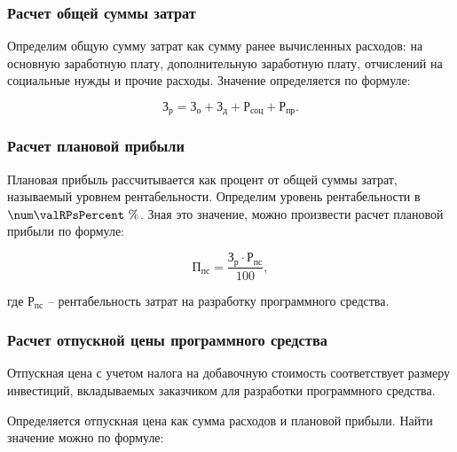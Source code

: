 \subsubsection{Расчет общей суммы затрат}

Определим общую сумму затрат как сумму ранее вычисленных расходов: на основную
заработную плату, дополнительную заработную плату, отчислений на социальные нужды и
прочие расходы. Значение определяется по формуле:

\begin{equation}
  \label{eq:econ:Zr}
  \text{З}_\text{р} = \text{З}_\text{о} + \text{З}_\text{д}
    + \text{Р}_\text{соц} + \text{Р}_\text{пр}.
\end{equation}


\subsubsection{Расчет плановой прибыли}


Плановая прибыль рассчитывается как процент от общей суммы затрат, называемый
уровнем рентабельности. Определим уровень рентабельности
в $ \num\valRPsPercent \ \% $. Зная это значение, можно произвести расчет плановой
прибыли по формуле:

\begin{equation}
  \label{eq:econ:PPs}
  \text{П}_\text{пс} = \frac{\text{З}_\text{р} \cdot \text{Р}_\text{пс}}
    {100},
\end{equation}
\begin{explanationx}
  \item[где] $ \text{Р}_\text{пс} $ -- рентабельность затрат на разработку программного средства.
\end{explanationx}


\subsubsection{Расчет отпускной цены программного средства}

Отпускная цена с учетом налога на добавочную стоимость соответствует размеру
инвестиций, вкладываемых заказчиком для разработки программного средства.

Определяется отпускная цена как сумма расходов и плановой прибыли.
Найти значение можно по формуле:

